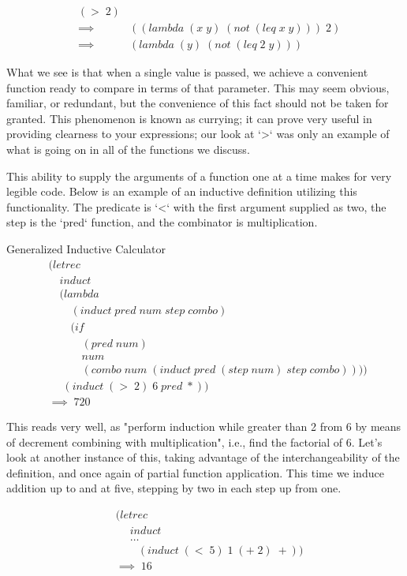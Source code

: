 \begin{align*}
& (> \; 2)
\\& \implies \; &((lambda \; (x \; y) \; (not \; (leq \; x \; y))) \; 2)
\\& \implies \; &(lambda \; (y) \; (not \; (leq \; 2 \; y))) \; 
\end{align*}

What we see is that when a single value is passed, we achieve a convenient 
function ready to compare in terms of that parameter. This may seem obvious, 
familiar, or redundant, but the convenience of this fact should not be taken for 
granted. This phenomenon is known as currying; it can prove very useful in 
providing clearness to your expressions; our look at `>` was only an example of 
what is going on in all of the functions we discuss.

This ability to supply the arguments of a function one at a time makes for very 
legible code. Below is an example of an inductive definition utilizing this 
functionality. The predicate is `<` with the first argument supplied as two, the 
step is the `pred` function, and the combinator is multiplication.

Generalized Inductive Calculator
\begin{align*}
& (letrec \; 
\\& \quad induct \; 
\\& \quad (lambda \; 
\\& \qquad (induct \; pred \; num \; step \; combo) \; 
\\& \qquad (if \; 
\\& \qquad \quad (pred \; num) \; 
\\& \qquad \quad num \; 
\\& \qquad \quad (combo \; num \; (induct \; pred \; (step \; num) \; step \; combo)))) \; 
\\& \quad \; (induct \; (> \; 2) \; 6 \; pred \; *))
\\& \implies \; 720
\end{align*}

This reads very well, as "perform induction while greater than 2 from 6 by means 
of decrement combining with multiplication", i.e., find the factorial of 6. Let's 
look at another instance of this, taking advantage of the interchangeability of 
the definition, and once again of partial function application. This time we 
induce addition up to and at five, stepping by two in each step up from one.

\begin{align*}
& (letrec \; 
\\& \quad \; induct \; 
\\& \quad \; \dots
\\& \qquad (induct \; (< \; 5) \; 1 \; (+ \; 2) \; +))
\\& \implies \; 16
\end{align*}

